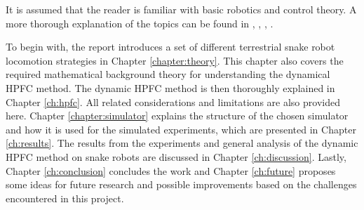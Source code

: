 It is assumed that the reader is familiar with basic robotics and control theory. A more thorough explanation of the topics can be found in \cite{lynch2017modern}, \cite{lynch2017modernCompTorque}, \cite{waldron2016kinematics}, \cite{liljeback2012snake}.

To begin with, the report introduces a set of different terrestrial snake robot locomotion strategies in Chapter \ref{chapter:theory}. This chapter also covers the required mathematical background theory for understanding the dynamical HPFC method. The dynamic HPFC method is then thoroughly explained in Chapter \ref{ch:hpfc}. All related considerations and limitations are also provided here. Chapter \ref{chapter:simulator} explains the structure of the chosen simulator and how it is used for the simulated experiments, which are presented in Chapter \ref{ch:results}. The results from the experiments and general analysis of the dynamic HPFC method on snake robots are discussed in Chapter \ref{ch:discussion}. Lastly, Chapter \ref{ch:conclusion} concludes the work and Chapter \ref{ch:future} proposes some ideas for future research and possible improvements based on the challenges encountered in this project.